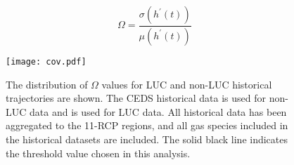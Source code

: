 \begin{equation}\label{eqs:cov}
    \Omega =  \frac{\sigma(h^{\prime}(t))}{\mu(h^{\prime}(t))}
\end{equation}


\begin{figure}
  \begin{center}
    \texttt{[image: cov.pdf]}
    \caption[]{
      \label{fig:cov}
      The distribution of $\Omega$ values for LUC and non-LUC historical
      trajectories are shown. The CEDS historical data is used for non-LUC data
      and  is used for LUC data. All historical data has
      been aggregated to the 11-RCP  regions,
      and all gas species included in the historical datasets are included. The
      solid black line indicates the threshold value chosen in this analysis.
    }
  \end{center}
\end{figure}

